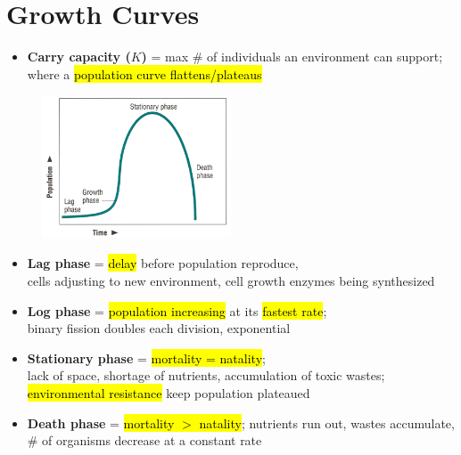 \documentclass[a4paper,12pt]{article}
\begin{document}
\section{Growth Curves}
\begin{itemize}
    \item{\textbf{Carry capacity ($K$)} = max \# of individuals an environment can support; \\ where a \hl{population curve flattens/plateaus}}
\end{itemize}
\begin{figure}[H]
    \centering
    \includegraphics[width=0.50\textwidth]{curve}
\end{figure}
\begin{itemize}
    \item{\textbf{Lag phase} = \hl{delay} before population reproduce, \\ cells adjusting to new environment, cell growth enzymes being synthesized}
    \item{\textbf{Log phase} = \hl{population increasing} at its \hl{fastest rate}; \\ binary fission doubles each division, exponential}
    \item{\textbf{Stationary phase} = \hl{mortality = natality}; \\ lack of space, shortage of nutrients, accumulation of toxic wastes; \\ \hl{environmental resistance} keep population plateaued}
    \item{\textbf{Death phase} = \hl{mortality $>$ natality}; nutrients run out, wastes accumulate, \\ \# of organisms decrease at a constant rate}
\end{itemize}

\pagebreak
\end{document}
